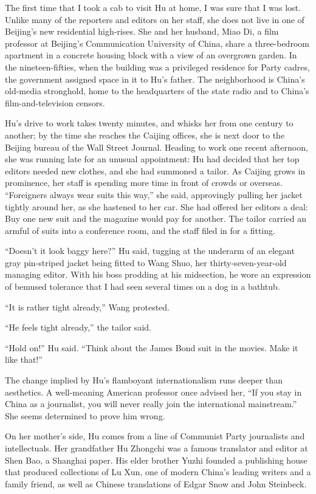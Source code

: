 ﻿\documentclass[12pt]{article}
\begin{document}
The first time that I took a cab to visit Hu at home, I was sure that I was lost. Unlike many of the
reporters and editors on her staff, she does not live in one of Beijing's new residential
high-rises. She and her husband, Miao Di, a film professor at Beijing's Communication University of
China, share a three-bedroom apartment in a concrete housing block with a view of an overgrown
garden. In the nineteen-fifties, when the building was a privileged residence for Party cadres, the
government assigned space in it to Hu's father. The neighborhood is China's old-media stronghold,
home to the headquarters of the state radio and to China's film-and-television censors.

Hu's drive to work takes twenty minutes, and whisks her from one century to another; by the time she
reaches the Caijing offices, she is next door to the Beijing bureau of the Wall Street Journal.
Heading to work one recent afternoon, she was running late for an unusual appointment: Hu had
decided that her top editors needed new clothes, and she had summoned a tailor. As Caijing grows in
prominence, her staff is spending more time in front of crowds or overseas. ``Foreigners always wear
suits this way,'' she said, approvingly pulling her jacket tightly around her, as she hastened to
her car. She had offered her editors a deal: Buy one new suit and the magazine would pay for
another. The tailor carried an armful of suits into a conference room, and the staff filed in for a
fitting.

``Doesn't it look baggy here?'' Hu said, tugging at the underarm of an elegant gray pin-striped
jacket being fitted to Wang Shuo, her thirty-seven-year-old managing editor. With his boss prodding
at his midsection, he wore an expression of bemused tolerance that I had seen several times on a dog
in a bathtub.

``It is rather tight already,'' Wang protested.

``He feels tight already,'' the tailor said.

``Hold on!'' Hu said. ``Think about the James Bond suit in the movies. Make it like that!''

The change implied by Hu's flamboyant internationalism runs deeper than aesthetics. A well-meaning
American professor once advised her, ``If you stay in China as a journalist, you will never really
join the international mainstream.'' She seems determined to prove him wrong.

On her mother's side, Hu comes from a line of Communist Party journalists and intellectuals. Her
grandfather Hu Zhongchi was a famous translator and editor at Shen Bao, a Shanghai paper. His elder
brother Yuzhi founded a publishing house that produced collections of Lu Xun, one of modern China's
leading writers and a family friend, as well as Chinese translations of Edgar Snow and John
Steinbeck.
\end{document}
